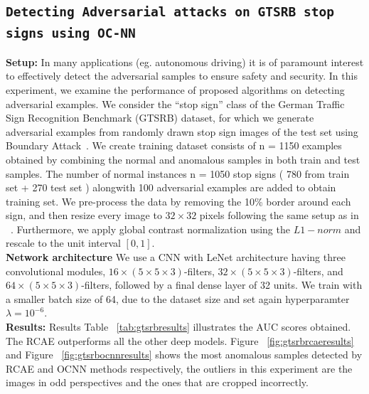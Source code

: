 \subsection{\tt  Detecting Adversarial attacks on GTSRB stop signs using OC-NN }
\textbf{Setup:}
In many applications (eg. autonomous driving) it is of paramount interest to effectively detect the adversarial samples to ensure safety and security. In this experiment, we
examine  the performance of proposed algorithms on  detecting
adversarial examples. We consider the “stop sign”
class of the German Traffic Sign Recognition Benchmark
(GTSRB) dataset, for which we generate adversarial examples
from randomly drawn stop sign images of the test set
using Boundary Attack~\cite{brendel2017decision}. We create training dataset consists of n = 1150 examples obtained by combining the normal and anomalous samples in both train and test samples. The  number of normal instances n = 1050 stop signs ( 780  from train set +  270 test set ) alongwith  100
adversarial examples are added to obtain training set. We pre-process the
data by removing the 10\% border around each sign, and then resize every image to $32 \times 32$ pixels following the same setup as in ~\cite{pmlrv80ruff18a}. Furthermore, we  apply global contrast normalization using the $L1-norm$ and rescale to the unit interval $[0, 1]$.\\
\textbf{Network architecture} We use a CNN with LeNet architecture having three convolutional modules, $16\times(5\times5\times3)$-filters, $32 \times (5 \times 5 \times 3)$-filters, and $64 \times (5 \times 5 \times 3)$-filters, followed by a final dense layer of 32 units. We train with a smaller batch size of 64, due to the dataset size and set again hyperparamter $\lambda = 10^{ - 6}$.\\
\textbf{Results:}
Results Table ~\ref{tab:gtsrbresults} illustrates the AUC scores obtained. The RCAE outperforms all the other deep models. Figure ~\ref{fig:gtsrbrcaeresults} and Figure ~\ref{fig:gtsrbocnnresults}  shows the most anomalous samples detected by RCAE and OCNN methods respectively, the outliers in this experiment are the images in odd perspectives and the ones that are cropped incorrectly.

